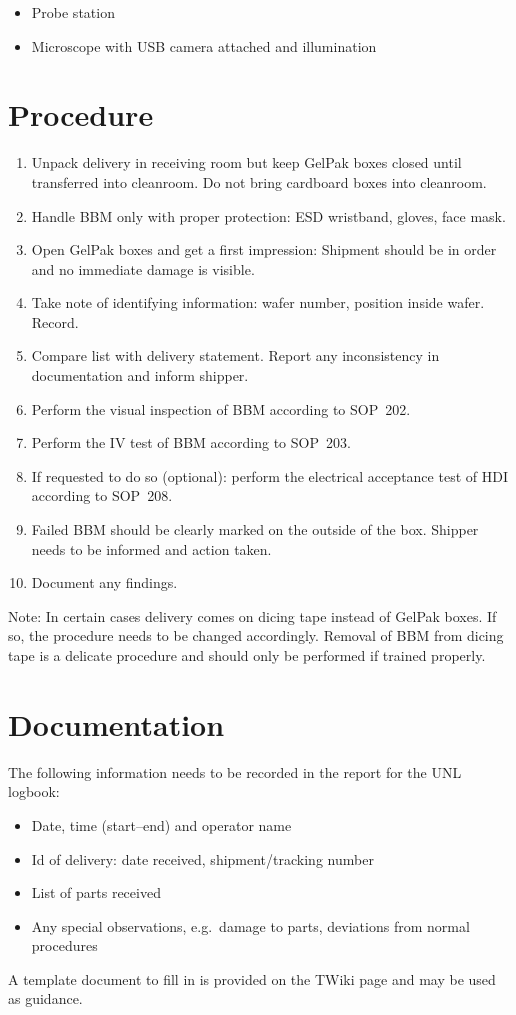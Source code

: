 \documentclass[12pt]{unlsilabsop}
\begin{document}
\begin{itemize}
    \item Probe station
    \item Microscope with USB camera attached and illumination
\end{itemize}

\section{Procedure}

\begin{enumerate}
    \item Unpack delivery in receiving room but keep GelPak boxes closed until transferred into cleanroom. Do not bring cardboard boxes into cleanroom.
    \item Handle BBM only with proper protection: ESD wristband, gloves, face mask.
    \item Open GelPak boxes and get a first impression: Shipment should be in order and no immediate damage is visible.
    \item Take note of identifying information: wafer number, position inside wafer. Record.
    \item Compare list with delivery statement. Report any inconsistency in documentation and inform shipper.
    \item Perform the visual inspection of BBM according to SOP~202.
    \item Perform the IV test of BBM according to SOP~203.
    \item If requested to do so (optional): perform the electrical acceptance test of HDI according to SOP~208.
    \item Failed BBM should be clearly marked on the outside of the box. Shipper needs to be informed and action taken.
    \item Document any findings.
\end{enumerate}
Note: In certain cases delivery comes on dicing tape instead of GelPak boxes. If so, the procedure needs to be changed accordingly. Removal of BBM from dicing tape is a delicate procedure and should only be performed if trained properly.

\section{Documentation}
The following information needs to be recorded in the report for the UNL logbook:
\begin{itemize}
    \item Date, time (start--end) and operator name
    \item Id of delivery: date received, shipment/tracking number
    \item List of parts received
    \item Any special observations, e.g.~damage to parts, deviations from normal procedures
\end{itemize}
A template document to fill in is provided on the TWiki page and may be used as guidance.
\end{document}
